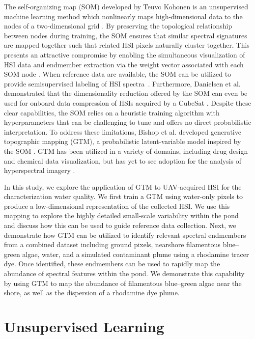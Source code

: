 The self-organizing map (SOM) developed by Teuvo Kohonen is an unsupervised
machine learning method which nonlinearly maps high-dimensional data to the
nodes of a two-dimensional grid \cite{kohonen-som-1}. By preserving the
topological relationship between nodes during training, the SOM ensures that
similar spectral signatures are mapped together such that related HSI pixels
naturally cluster together. This presents an attractive compromise by enabling
the simultaneous visualization of HSI data and endmember extraction via the
weight vector associated with each SOM node \cite{cantero2004analysis,
  duran2007time,som-hsi}. When reference data are available, the SOM can be
utilized to provide semisupervised labeling of HSI
spectra~\cite{riese2019supervised}. Furthermore, Danielsen et al. demonstrated
that the dimensionality reduction offered by the SOM can even be used for
onboard data compression of HSIs acquired by a CubeSat \cite{danielsen2021self}.
Despite these clear capabilities, the SOM relies on a heuristic training
algorithm with hyperparameters that can be challenging to tune and offers no
direct probabilistic interpretation. To address these limitations, Bishop et al.
developed  generative topographic mapping (GTM), a probabilistic latent-variable
model inspired by the SOM \cite{gtm-orig}.  GTM has been utilized in a variety
of domains, including drug design and chemical data visualization, but has yet
to see adoption for the analysis of hyperspectral imagery
\cite{kireeva2012generative, gaspar2015chemical, horvath2019generative}.

In this study, we explore the application of  GTM to UAV-acquired HSI for the
characterization water quality. We first train a GTM using water-only pixels to
produce a low-dimensional representation of the collected HSI. We use this mapping to
explore the highly detailed small-scale variability within the pond and discuss
how this can be used to guide reference data collection. Next, we demonstrate
how  GTM can be utilized to identify relevant spectral endmembers from a
combined dataset including ground pixels, nearshore filamentous blue--green
algae, water, and a simulated contaminant plume using a rhodamine tracer dye.
Once identified, these endmembers can be used to rapidly map the abundance of
spectral features within the pond. We demonstrate this capability by using  GTM
to map the abundance of filamentous blue--green algae near the shore, as well as
the dispersion of a rhodamine dye plume.


\section{Unsupervised Learning}

